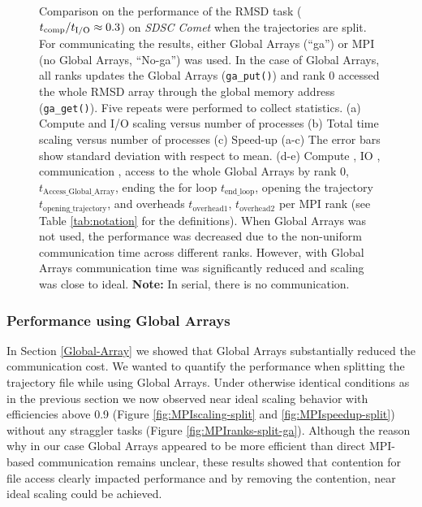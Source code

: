 \begin{figure}[ht!]
\caption{Comparison on the performance of the RMSD task (${t}_{\text{comp}}/{t}_{\text{I/O}} \approx 0.3$) on \emph{SDSC Comet} when the trajectories are split. For communicating the results, either Global Arrays (``ga'') or MPI (no Global Arrays, ``No-ga'') was used.  In the case of Global Arrays, all ranks updates the Global Arrays (\texttt{ga\_put()}) and rank 0 accessed the whole RMSD array through the global memory address (\texttt{ga\_get()}).  Five repeats were performed to collect statistics. (a) Compute and I/O scaling versus number of processes (b) Total time scaling versus number of processes (c) Speed-up (a-c) The error bars show standard deviation with respect to mean. (d-e) Compute \tcomp, IO \tIO, communication \tcomm, access to the whole Global Arrays by rank 0, $t_{\text{Access\_Global\_Array}}$, ending the for loop $t_{\text{end\_loop}}$, opening the trajectory $t_{\text{opening\_trajectory}}$, and overheads $t_{\text{overhead1}}$, $t_{\text{overhead2}}$ per MPI rank (see Table \ref{tab:notation} for the definitions). When Global Arrays was not used, the performance was decreased due to the non-uniform communication time across different ranks. However, with Global Arrays communication time was significantly reduced and scaling was close to ideal. \textbf{Note:} In serial, there is no communication.}
\label{fig:MPIwithIO-split}
\end{figure}

\subsubsection*{Performance using Global Arrays}
In Section \ref{Global-Array} we showed that Global Arrays substantially reduced the communication cost. 
We wanted to quantify the performance when splitting the trajectory file while using Global Arrays.
Under otherwise identical conditions as in the previous section we now observed near ideal scaling behavior with efficiencies above 0.9 (Figure \ref{fig:MPIscaling-split} and \ref{fig:MPIspeedup-split}) without any straggler tasks (Figure \ref{fig:MPIranks-split-ga}).  
Although the reason why in our case Global Arrays appeared to be more efficient than direct MPI-based communication remains unclear, these results showed that contention for file access clearly impacted performance and by removing the contention, near ideal scaling could be achieved.

